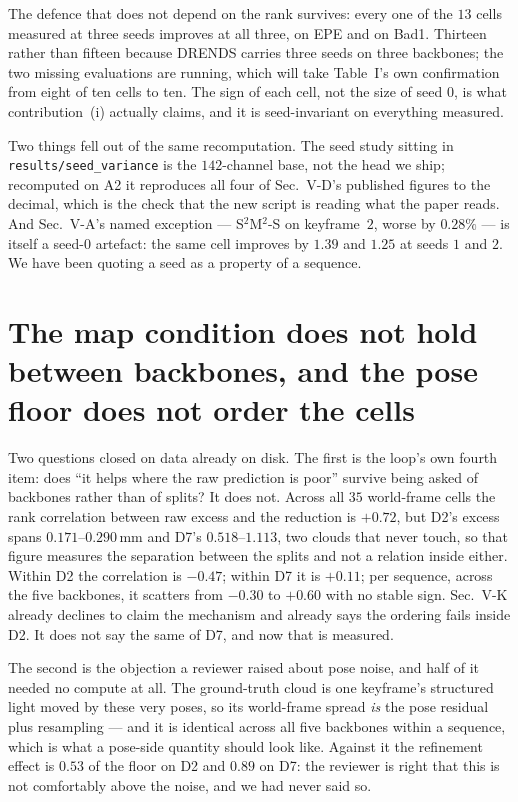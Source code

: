 \documentclass[11pt,a4paper]{article}
\begin{document}
The defence that does not depend on the rank survives: every one of the $13$
cells measured at three seeds improves at all three, on EPE and on Bad1.
Thirteen rather than fifteen because DRENDS carries three seeds on three
backbones; the two missing evaluations are running, which will take Table~I's
own confirmation from eight of ten cells to ten. The sign of each cell, not
the size of seed $0$, is what contribution~(i) actually claims, and it is
seed-invariant on everything measured.

Two things fell out of the same recomputation. The seed study sitting in
\texttt{results/seed\_variance} is the $142$-channel base, not the head we
ship; recomputed on A2 it reproduces all four of Sec.~V-D's published figures
to the decimal, which is the check that the new script is reading what the
paper reads. And Sec.~V-A's named exception --- S$^2$M$^2$-S on keyframe~$2$,
worse by $0.28\%$ --- is itself a seed-$0$ artefact: the same cell improves by
$1.39$ and $1.25$ at seeds $1$ and $2$. We have been quoting a seed as a
property of a sequence.



\section*{The map condition does not hold between backbones, and the pose floor does not order the cells}

Two questions closed on data already on disk. The first is the loop's own
fourth item: does ``it helps where the raw prediction is poor'' survive being
asked of backbones rather than of splits? It does not. Across all $35$
world-frame cells the rank correlation between raw excess and the reduction is
$+0.72$, but D2's excess spans $0.171$--$0.290$\,mm and D7's $0.518$--$1.113$,
two clouds that never touch, so that figure measures the separation between
the splits and not a relation inside either. Within D2 the correlation is
$-0.47$; within D7 it is $+0.11$; per sequence, across the five backbones, it
scatters from $-0.30$ to $+0.60$ with no stable sign. Sec.~V-K already declines
to claim the mechanism and already says the ordering fails inside D2. It does
not say the same of D7, and now that is measured.

The second is the objection a reviewer raised about pose noise, and half of it
needed no compute at all. The ground-truth cloud is one keyframe's structured
light moved by these very poses, so its world-frame spread \emph{is} the pose
residual plus resampling --- and it is identical across all five backbones
within a sequence, which is what a pose-side quantity should look like.
Against it the refinement effect is $0.53$ of the floor on D2 and $0.89$ on
D7: the reviewer is right that this is not comfortably above the noise, and we
had never said so.
\end{document}
